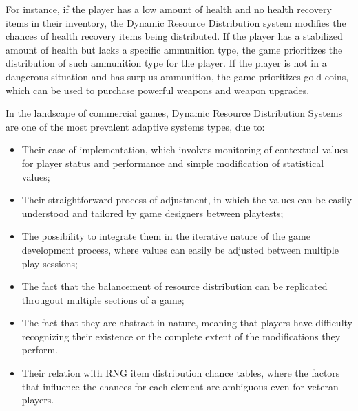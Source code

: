For instance, if the player has a low amount of health and no health recovery items in their inventory, the Dynamic Resource Distribution system modifies the chances of health recovery items being distributed. If the player has a stabilized amount of health but lacks a specific ammunition type, the game prioritizes the distribution of such ammunition type for the player. If the player is not in a dangerous situation and has surplus ammunition, the game prioritizes gold coins, which can be used to purchase powerful weapons and weapon upgrades. 


In the landscape of commercial games, Dynamic Resource Distribution Systems are one of the most prevalent adaptive systems types, due to:
\begin{itemize} 
    \item{Their ease of implementation, which involves monitoring of contextual values for player status and performance and simple modification of statistical values;}
    \item{Their straightforward process of adjustment, in which the values can be easily understood and tailored by game designers between playtests;}
    \item{The possibility to integrate them in the iterative nature of the game development process, where values can easily be adjusted between multiple play sessions;}
    \item{The fact that the balancement of resource distribution can be replicated througout multiple sections of a game;}
    \item{The fact that they are abstract in nature, meaning that players have difficulty recognizing their existence or the complete extent of the modifications they perform.}
    \item{Their relation with RNG item distribution chance tables, where the factors that influence the chances for each element are ambiguous even for veteran players.}
\end{itemize}

